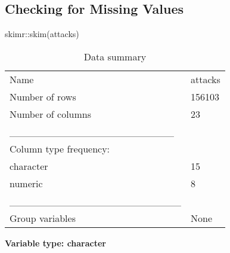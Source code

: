 \documentclass[
]{article}
\newenvironment{Shaded}{\begin{snugshade}}{\end{snugshade}}
\newcommand{\FunctionTok}[1]{\textcolor[rgb]{0.00,0.00,0.00}{#1}}
\newcommand{\NormalTok}[1]{#1}
\newcommand{\SpecialCharTok}[1]{\textcolor[rgb]{0.00,0.00,0.00}{#1}}
\begin{document}
\hypertarget{checking-for-missing-values}{%
\subsection{Checking for Missing
Values}\label{checking-for-missing-values}}

\begin{Shaded}
\begin{Highlighting}[]
\NormalTok{skimr}\SpecialCharTok{::}\FunctionTok{skim}\NormalTok{(attacks)}
\end{Highlighting}
\end{Shaded}

\begin{longtable}[]{@{}ll@{}}
\caption{Data summary}\tabularnewline
\toprule()
\endhead
Name & attacks \\
Number of rows & 156103 \\
Number of columns & 23 \\
\_\_\_\_\_\_\_\_\_\_\_\_\_\_\_\_\_\_\_\_\_\_\_ & \\
Column type frequency: & \\
character & 15 \\
numeric & 8 \\
\_\_\_\_\_\_\_\_\_\_\_\_\_\_\_\_\_\_\_\_\_\_\_\_ & \\
Group variables & None \\
\bottomrule()
\end{longtable}

\textbf{Variable type: character}
\end{document}
